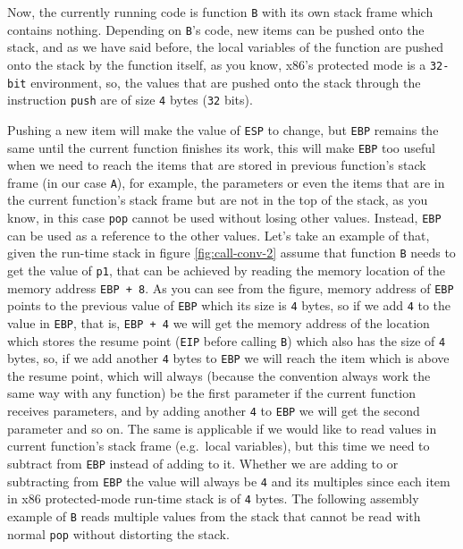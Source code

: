 Now, the currently running code is function \lstinline!B! with its own
stack frame which contains nothing. Depending on \lstinline!B!'s code,
new items can be pushed onto the stack, and as we have said before, the
local variables of the function are pushed onto the stack by the
function itself, as you know, x86's protected mode is a
\lstinline!32-bit! environment, so, the values that are pushed onto the
stack through the instruction \lstinline!push! are of size \lstinline!4!
bytes (\lstinline!32! bits).

Pushing a new item will make the value of \lstinline!ESP! to change, but
\lstinline!EBP! remains the same until the current function finishes its
work, this will make \lstinline!EBP! too useful when we need to reach
the items that are stored in previous function's stack frame (in our
case \lstinline!A!), for example, the parameters or even the items that
are in the current function's stack frame but are not in the top of the
stack, as you know, in this case \lstinline!pop! cannot be used without
losing other values. Instead, \lstinline!EBP! can be used as a reference
to the other values. Let's take an example of that, given the run-time
stack in figure \ref{fig:call-conv-2} assume that function \lstinline!B!
needs to get the value of \lstinline!p1!, that can be achieved by
reading the memory location of the memory address \lstinline!EBP + 8!.
As you can see from the figure, memory address of \lstinline!EBP! points
to the previous value of \lstinline!EBP! which its size is \lstinline!4!
bytes, so if we add \lstinline!4! to the value in \lstinline!EBP!, that
is, \lstinline!EBP + 4! we will get the memory address of the location
which stores the resume point (\lstinline!EIP! before calling
\lstinline!B!) which also has the size of \lstinline!4! bytes, so, if we
add another \lstinline!4! bytes to \lstinline!EBP! we will reach the
item which is above the resume point, which will always (because the
convention always work the same way with any function) be the first
parameter if the current function receives parameters, and by adding
another \lstinline!4! to \lstinline!EBP! we will get the second
parameter and so on. The same is applicable if we would like to read
values in current function's stack frame (e.g.~local variables), but
this time we need to subtract from \lstinline!EBP! instead of adding to
it. Whether we are adding to or subtracting from \lstinline!EBP! the
value will always be \lstinline!4! and its multiples since each item in
x86 protected-mode run-time stack is of \lstinline!4! bytes. The
following assembly example of \lstinline!B! reads multiple values from
the stack that cannot be read with normal \lstinline!pop! without
distorting the stack.

